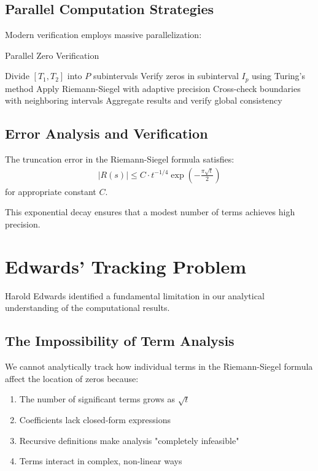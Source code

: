 \subsection{Parallel Computation Strategies}

Modern verification employs massive parallelization:

\begin{algorithm}[H]
\caption{Parallel Zero Verification}
\begin{algorithmic}
\State Divide $[T_1, T_2]$ into $P$ subintervals
    \State Verify zeros in subinterval $I_p$ using Turing's method
    \State Apply Riemann-Siegel with adaptive precision
    \State Cross-check boundaries with neighboring intervals
\EndFor
\State Aggregate results and verify global consistency
\end{algorithmic}
\end{algorithm}

\subsection{Error Analysis and Verification}

\begin{theorem}
The truncation error in the Riemann-Siegel formula satisfies:
\begin{align}
|R(s)| \leq C \cdot t^{-1/4} \exp\left(-\frac{\pi\sqrt{t}}{2}\right)
\end{align}
for appropriate constant $C$.
\end{theorem}

This exponential decay ensures that a modest number of terms achieves high precision.

\section{Edwards' Tracking Problem}
\label{sec:edwards-tracking}

Harold Edwards identified a fundamental limitation in our analytical understanding of the computational results.

\subsection{The Impossibility of Term Analysis}

\begin{problem}
We cannot analytically track how individual terms in the Riemann-Siegel formula affect the location of zeros because:
\begin{enumerate}
\item The number of significant terms grows as $\sqrt{t}$
\item Coefficients lack closed-form expressions  
\item Recursive definitions make analysis "completely infeasible"
\item Terms interact in complex, non-linear ways
\end{enumerate}
\end{problem}

